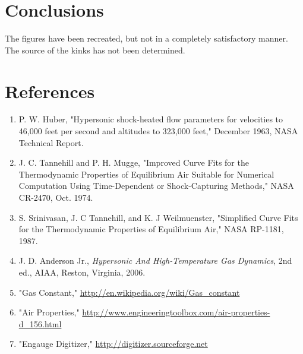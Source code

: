 \documentclass[9pt]{article}
\begin{document}
\section*{Conclusions}
The figures have been recreated, but not in a completely satisfactory manner. The source of the kinks has not been determined.

\section*{References}
\begin{enumerate}
\item P. W. Huber, "Hypersonic shock-heated flow parameters for velocities to 46,000 feet per second and altitudes to 323,000 feet," December 1963, NASA Technical Report.
\item J. C. Tannehill and P. H. Mugge, "Improved Curve Fits for the Thermodynamic Properties of Equilibrium Air Suitable for Numerical Computation Using Time-Dependent or Shock-Capturing Methods," NASA CR-2470, Oct. 1974.
\item S. Srinivasan, J. C Tannehill, and K. J Weilmuenster, "Simplified Curve Fits for the Thermodynamic Properties of Equilibrium Air," NASA RP-1181, 1987.
\item J. D. Anderson Jr., \textit{Hypersonic And High-Temperature Gas Dynamics}, 2nd ed., AIAA, Reston, Virginia, 2006.
\item "Gas Constant," \url{http://en.wikipedia.org/wiki/Gas_constant}
\item "Air Properties," \url{http://www.engineeringtoolbox.com/air-properties-d_156.html}
\item "Engauge Digitizer," \url{http://digitizer.sourceforge.net}
\end{enumerate}

% 
% 
\end{document}
